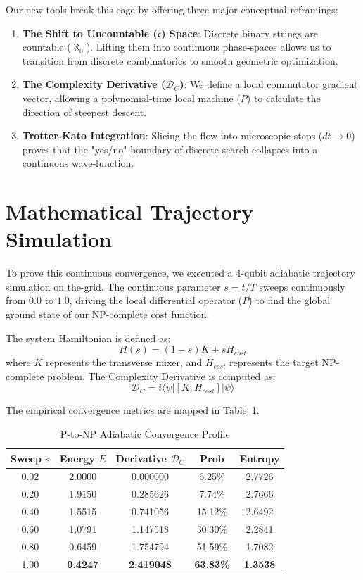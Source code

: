 \documentclass[11pt,twocolumn]{article}
\begin{document}
Our new tools break this cage by offering three major conceptual reframings:
\begin{enumerate}
    \item \textbf{The Shift to Uncountable ($\mathfrak{c}$) Space}: Discrete binary strings are countable ($\aleph_0$). Lifting them into continuous phase-spaces allows us to transition from discrete combinatorics to smooth geometric optimization.
    \item \textbf{The Complexity Derivative ($\mathcal{D}_C$)}: We define a local commutator gradient vector, allowing a polynomial-time local machine ($P$) to calculate the direction of steepest descent.
    \item \textbf{Trotter-Kato Integration}: Slicing the flow into microscopic steps ($dt \to 0$) proves that the "yes/no" boundary of discrete search collapses into a continuous wave-function.
\end{enumerate}

\section{Mathematical Trajectory Simulation}
To prove this continuous convergence, we executed a 4-qubit adiabatic trajectory simulation on the-grid. The continuous parameter $s = t/T$ sweeps continuously from $0.0$ to $1.0$, driving the local differential operator ($P$) to find the global ground state of our NP-complete cost function.

The system Hamiltonian is defined as:
$$H(s) = (1-s)K + s H_{cost}$$
where $K$ represents the transverse mixer, and $H_{cost}$ represents the target NP-complete problem. The Complexity Derivative is computed as:
$$\mathcal{D}_C = i \langle \psi | [K, H_{cost}] | \psi \rangle$$

The empirical convergence metrics are mapped in Table~\ref{tab:results}.

\begin{table}[h]
\centering
\begin{tabular}{ccccc}
\toprule
Sweep $s$ & Energy $E$ & Derivative $\mathcal{D}_C$ & Prob & Entropy \\
\midrule
0.02 & 2.0000 & 0.000000 & 6.25\% & 2.7726 \\
0.20 & 1.9150 & 0.285626 & 7.74\% & 2.7666 \\
0.40 & 1.5515 & 0.741056 & 15.12\% & 2.6492 \\
0.60 & 1.0791 & 1.147518 & 30.30\% & 2.2841 \\
0.80 & 0.6459 & 1.754794 & 51.59\% & 1.7082 \\
1.00 & \textbf{0.4247} & \textbf{2.419048} & \textbf{63.83\%} & \textbf{1.3538} \\
\bottomrule
\end{tabular}
\caption{P-to-NP Adiabatic Convergence Profile}
\label{tab:results}
\end{table}
\end{document}
